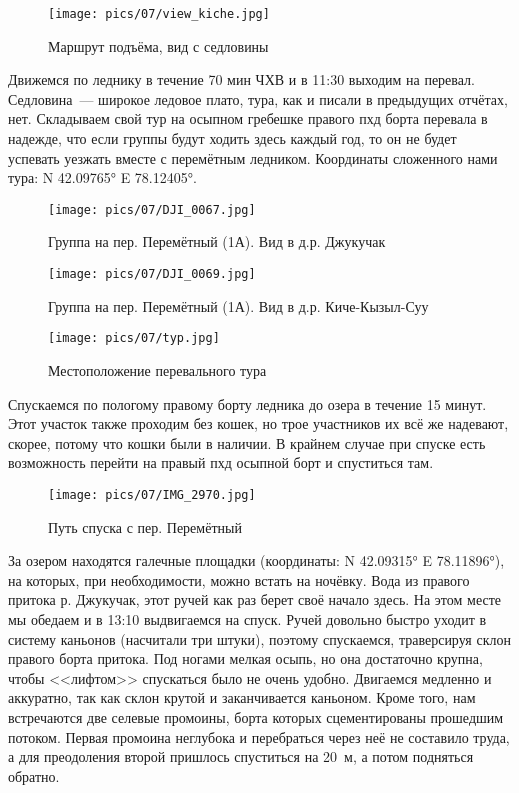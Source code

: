 \begin{figure}[h!]
	\centering
	\texttt{[image: pics/07/view\_kiche.jpg]}
	\caption{Маршрут подъёма, вид с седловины}
	\label{fig:view_kiche.jpg}
\end{figure}

Движемся по леднику в течение 70 мин ЧХВ и в 11:30 выходим на перевал. Седловина~--- широкое ледовое плато, тура, как и писали в предыдущих отчётах, нет. Складываем свой тур на осыпном гребешке правого пхд борта перевала в надежде, что если группы будут ходить здесь каждый год, то он не будет успевать уезжать вместе с перемётным ледником. Координаты сложенного нами тура: N 42.09765° E 78.12405°.

\begin{figure}[h!]
	\centering
	\texttt{[image: pics/07/DJI\_0067.jpg]}
	\caption{Группа на пер. Перемётный (1А). Вид в д.р. Джукучак}
	\label{fig:DJI_0067.jpg}
\end{figure}

\begin{figure}[h!]
	\centering
	\texttt{[image: pics/07/DJI\_0069.jpg]}
	\caption{Группа на пер. Перемётный (1А). Вид в д.р. Киче-Кызыл-Суу}
	\label{fig:DJI_0069.jpg}
\end{figure}


\begin{figure}[h!]
	\centering
	\texttt{[image: pics/07/typ.jpg]}
	\caption{Местоположение перевального тура}
	\label{fig:typ.jpg}
\end{figure}

Спускаемся по пологому правому борту ледника до озера в течение 15 минут. Этот участок также проходим без кошек, но трое участников их всё же надевают, скорее, потому что кошки были в наличии. В крайнем случае при спуске есть возможность перейти на правый пхд осыпной борт и спуститься там.

\begin{figure}[h!]
	\centering
	\texttt{[image: pics/07/IMG\_2970.jpg]}
	\caption{Путь спуска с пер. Перемётный}
	\label{fig:IMG_2970.jpg}
\end{figure}

За озером находятся галечные площадки (координаты: N 42.09315° E 78.11896°), на которых, при необходимости, можно встать на ночёвку. Вода из правого притока р. Джукучак, этот ручей как раз берет своё начало здесь. На этом месте мы обедаем и в 13:10 выдвигаемся на спуск. Ручей довольно быстро уходит в систему каньонов (насчитали три штуки), поэтому спускаемся, траверсируя склон правого борта притока. Под ногами мелкая осыпь, но она достаточно крупна, чтобы <<лифтом>> спускаться было не очень удобно. Двигаемся медленно и аккуратно, так как склон крутой и заканчивается каньоном. Кроме того, нам встречаются две селевые промоины, борта которых сцементированы прошедшим потоком. Первая промоина неглубока и перебраться через неё не составило труда, а для преодоления второй пришлось спуститься на 20~м, а потом подняться обратно.

